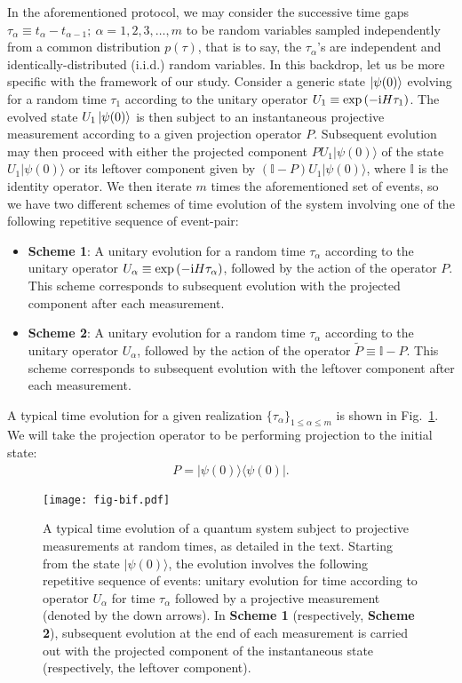 \documentclass[12pt]{iopart}
\def\ra{\rangle}
\def\ket#1{\mathinner{|{#1}\rangle}}
\begin{document}
In the aforementioned protocol,  we may consider the successive time
gaps $\tau_\alpha \equiv
t_\alpha-t_{\alpha-1};~\alpha=1,2,3,\ldots,m$ to
be random variables sampled independently from a common
distribution $p(\tau)$, that is to say, the $\tau_\alpha$'s are independent
and identically-distributed (i.i.d.) random variables.  In this backdrop, let us be more  specific with the framework of our study.  Consider a generic state $\ket{\psi(0)}$ evolving for
a random time $\tau_1$ according to the unitary operator
$U_{1} \equiv \exp{(-{\rm i}H \tau_1)}$.
The evolved state $U_1\ket{\psi(0)}$ is then subject to an
instantaneous projective measurement according to a given projection operator $P$.
Subsequent evolution may then proceed with either the projected
component $PU_{1}|\psi(0)\rangle$ of the state
$U_1|\psi(0)\rangle$ or its leftover component
given by $(\mathbb{I}-P)U_{1}|\psi(0)\rangle$, where $\mathbb{I}$ is the identity
operator. We then iterate $m$ times the aforementioned set of events, so we have two different schemes of time
evolution of the system involving one of the following repetitive
sequence of event-pair:
\begin{itemize}
        \item \textbf{Scheme 1}: A unitary
        evolution for a random time $\tau_\alpha$ according to the unitary
operator $U_\alpha \equiv \exp{(-{\rm i}H\tau_\alpha)}$, followed by the action of the
operator $P$. This scheme corresponds to subsequent evolution with the
                projected component after each measurement.
                \item \textbf{Scheme 2}: A unitary
        evolution for a random time $\tau_\alpha$ according to the unitary
operator $U_\alpha$, followed by the action of the
operator $\widetilde{P} \equiv \mathbb{I}-P$. This scheme corresponds to subsequent
                evolution with the leftover component after each measurement.
\end{itemize}
A typical time evolution for a given realization $\{\tau_\alpha\}_{1\le
\alpha\le m}$ is shown in Fig.~\ref{fig:qua-evolution-schematic}. 
We will take the projection
operator to be performing projection to the initial state:
\begin{align}
P=|\psi(0)\rangle\langle \psi(0)|.  \label{eq:qua-P-operator-def}
\end{align}
\begin{figure}[!htbp]
\centering
\texttt{[image: fig-bif.pdf]}
        \caption{A typical time evolution of a quantum system subject to projective measurements at random times, as
detailed in the text. Starting from the state $|\psi(0)\ra$, the evolution involves
the following repetitive sequence of events: unitary evolution for time according
to operator $U_\alpha$ for time $\tau_\alpha$
        followed by a projective measurement (denoted by the down
        arrows).  In
        \textbf{Scheme 1} (respectively, \textbf{Scheme 2}), subsequent
        evolution at the end of each measurement is carried out with the
        projected component of the instantaneous state (respectively, the leftover component). }
\label{fig:qua-evolution-schematic}
\end{figure}
\end{document}
